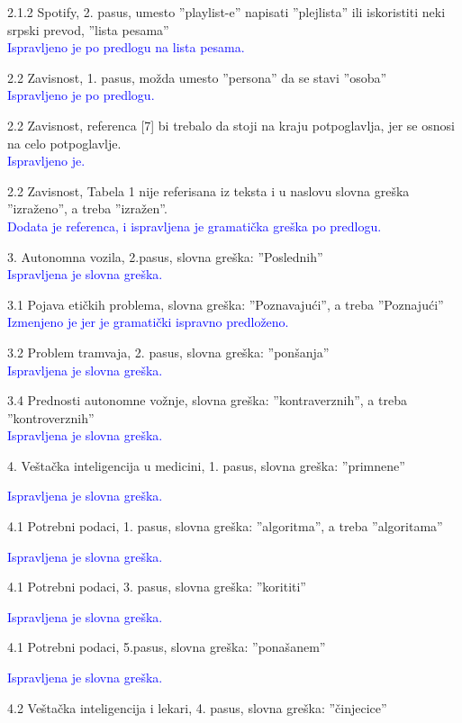 \documentclass[a4paper]{report}
\newcommand{\odgovor}[1]{\textcolor{blue}{#1}}
\begin{document}
2.1.2 Spotify, 2. pasus, umesto ''playlist-e'' napisati ''plejlista'' ili iskoristiti neki srpski prevod, ''lista pesama'' \\
\odgovor{Ispravljeno je po predlogu na lista pesama.}

2.2 Zavisnost, 1. pasus, možda umesto ''persona'' da se stavi ''osoba'' \\
\odgovor{Ispravljeno je po predlogu.}

2.2 Zavisnost, referenca [7] bi trebalo da stoji na kraju potpoglavlja, jer se osnosi na celo potpoglavlje. \\
\odgovor{Ispravljeno je.}

2.2 Zavisnost, Tabela 1 nije referisana iz teksta i u naslovu slovna greška ''izraženo'', a treba ''izražen''. \\
\odgovor{Dodata je referenca, i ispravljena je gramatička greška po predlogu.}

3. Autonomna vozila, 2.pasus, slovna greška: ''Poslednih'' \\
\odgovor{Ispravljena je slovna greška.}

3.1 Pojava etičkih problema, slovna greška: ''Poznavajući'', a treba ''Poznajući'' \\
\odgovor{Izmenjeno je jer je gramatički ispravno predloženo.}

3.2 Problem tramvaja, 2. pasus, slovna greška: ''ponšanja'' \\
\odgovor{Ispravljena je slovna greška.}

3.4 Prednosti autonomne vožnje, slovna greška: ''kontraverznih'', a treba ''kontroverznih'' \\
\odgovor{Ispravljena je slovna greška.}

4. Veštačka inteligencija u medicini, 1. pasus, slovna greška: ''primnene''

\odgovor{Ispravljena je slovna greška.}

4.1 Potrebni podaci, 1. pasus, slovna greška: ''algoritma'', a treba ''algoritama''

\odgovor{Ispravljena je slovna greška.}

4.1 Potrebni podaci, 3. pasus, slovna greška: ''korititi''

\odgovor{Ispravljena je slovna greška.}

4.1 Potrebni podaci, 5.pasus, slovna greška: ''ponašanem''

\odgovor{Ispravljena je slovna greška.}

4.2 Veštačka inteligencija i lekari, 4. pasus, slovna greška: ''činjecice''
\end{document}
